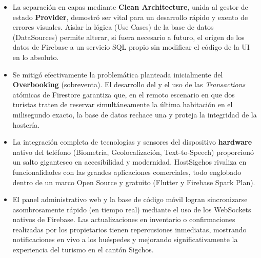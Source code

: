 \documentclass[12pt,letterpaper]{report}
\newcommand{\pathtext}[1]{\texttt{\detokenize{#1}}}
\begin{document}
\begin{itemize}[label=$\blacksquare$]
    \item La separación en capas mediante \textbf{Clean Architecture}, unida al gestor de estado \textbf{Provider}, demostró ser vital para un desarrollo rápido y exento de errores visuales. Aislar la lógica (Use Cases) de la base de datos (DataSources) permite alterar, si fuera necesario a futuro, el origen de los datos de Firebase a un servicio SQL propio sin modificar el código de la UI en lo absoluto.
    \item Se mitigó efectivamente la problemática planteada inicialmente del \textbf{Overbooking} (sobreventa). El desarrollo del \pathtext{VerificarDisponibilidadUseCase} y el uso de las \textit{Transactions} atómicas de Firestore garantiza que, en el remoto escenario en que dos turistas traten de reservar simultáneamente la última habitación en el milisegundo exacto, la base de datos rechace una y proteja la integridad de la hostería.
    \item La integración completa de tecnologías y sensores del dispositivo \textbf{hardware} nativo del teléfono (Biometría, Geolocalización, Text-to-Speech) proporcionó un salto gigantesco en accesibilidad y modernidad. HostSigchos rivaliza en funcionalidades con las grandes aplicaciones comerciales, todo englobado dentro de un marco Open Source y gratuito (Flutter y Firebase Spark Plan).
    \item El panel administrativo web y la base de código móvil logran sincronizarse asombrosamente rápido (en tiempo real) mediante el uso de los WebSockets nativos de Firebase. Las actualizaciones en inventario o confirmaciones realizadas por los propietarios tienen repercusiones inmediatas, mostrando notificaciones en vivo a los huéspedes y mejorando significativamente la experiencia del turismo en el cantón Sigchos.
\end{itemize}
\end{document}
